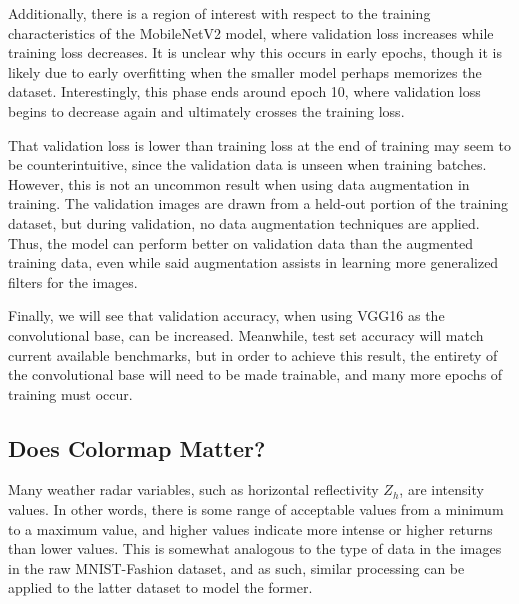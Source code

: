 Additionally, there is a region of interest with respect to the training characteristics of the MobileNetV2 model, where validation loss increases while training loss decreases.
It is unclear why this occurs in early epochs, though it is likely due to early overfitting when the smaller model perhaps memorizes the dataset.
Interestingly, this phase ends around epoch 10, where validation loss begins to decrease again and ultimately crosses the training loss.

That validation loss is lower than training loss at the end of training may seem to be counterintuitive, since the validation data is unseen when training batches.
However, this is not an uncommon result when using data augmentation in training.
The validation images are drawn from a held-out portion of the training dataset, but during validation, no data augmentation techniques are applied.
Thus, the model can perform better on validation data than the augmented training data, even while said augmentation assists in learning more generalized filters for the images.

Finally, we will see that validation accuracy, when using VGG16 as the convolutional base, can be increased.
Meanwhile, test set accuracy will match current available benchmarks, but in order to achieve this result, the entirety of the convolutional base will need to be made trainable, and many more epochs of training must occur.

\subsection{Does Colormap Matter?}
\label{ssec:classifying_colormap}

Many weather radar variables, such as horizontal reflectivity $Z_h$, are intensity values.
In other words, there is some range of acceptable values from a minimum to a maximum value, and higher values indicate more intense or higher returns than lower values.
This is somewhat analogous to the type of data in the images in the raw MNIST-Fashion dataset, and as such, similar processing can be applied to the latter dataset to model the former.

